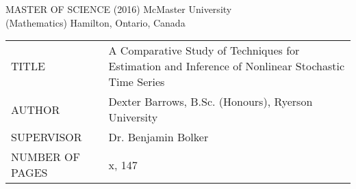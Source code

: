 \newpage
\thispagestyle{empty}
\centering
\null


MASTER OF SCIENCE (2016) 	\hfill 	McMaster University \\
(Mathematics)				\hfill	Hamilton, Ontario, Canada \\

\vspace{3cm}

\begin{tabular}{p{5cm}p{10cm}}
	TITLE 			& A Comparative Study of Techniques for Estimation and Inference of Nonlinear Stochastic Time Series \\
	AUTHOR 			& Dexter Barrows, B.Sc. (Honours), Ryerson University \\
	SUPERVISOR 		& Dr. Benjamin Bolker \\
	NUMBER OF PAGES & x, 147 \\
\end{tabular}